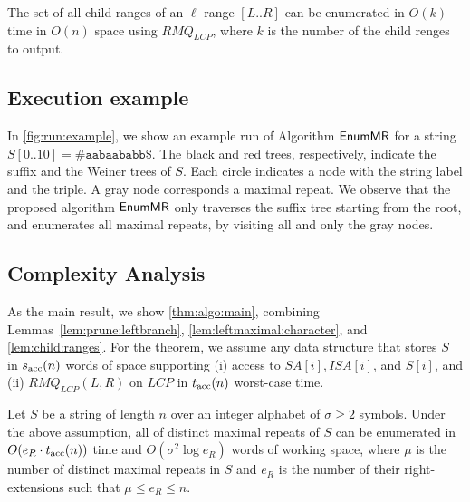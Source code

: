 \begin{lemma}\label{lem:genchildren}
  The set of all child ranges of an $\ell$-range $[L..R]$ can be enumerated in $O(k)$ time in $O(n)$ space
  using $RMQ_{LCP}$, 
where $k$ is the number of the child renges to output.  
\end{lemma}


\subsection{Execution example}

In \cref{fig:run:example}, we show an example run of Algorithm $\textsf{EnumMR}$ for a string $S[0..10] = \mathtt{\#aabaababb\$}$. The black and red trees, respectively, indicate the suffix and the Weiner trees of $S$. Each circle indicates a node with the string label and the triple. A gray node corresponds a maximal repeat. 
We observe that the proposed algorithm $\textsf{EnumMR}$ only traverses the suffix tree starting from the root, and enumerates all maximal repeats, by visiting all and only the gray nodes. 


\subsection{Complexity Analysis}
As the main result, we show \cref{thm:algo:main}, 
combining Lemmas~\ref{lem:prune:leftbranch},
\ref{lem:leftmaximal:character}, and 
\ref{lem:child:ranges}.
For the theorem, we assume any data structure that stores $S$ in $s_{\mathrm{acc}}(n)$ words of space supporting (i) access to $SA[i], ISA[i]$, and $S[i]$, and (ii) $RMQ_{LCP}(L, R)$ on $LCP$ in $t_{\mathrm{acc}}(n)$ worst-case time.

\begin{theorem}\label{thm:algo:main}
  Let $S$ be a string of length $n$ over an integer alphabet of $\sigma\ge 2$ symbols.
  Under the above assumption, all of distinct maximal repeats of $S$ can be enumerated in $O(e_R\cdot t_{\mathrm{acc}}(n))$ time and $O(\sigma^2 \log e_R)$ words of working space, where $\mu$ is the number of distinct maximal repeats in $S$ and  $e_R$ is the number of their right-extensions such that $\mu \le e_R \le n$. 
\end{theorem}


